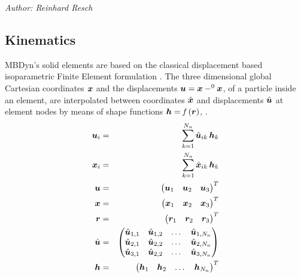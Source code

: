 %
%
%
%
%
%
%
%
\emph{Author: Reinhard Resch}
\subsection{Kinematics}
MBDyn's solid elements are based on the classical displacement based isoparametric Finite Element formulation \cite{BATHE2016}.
The three dimensional global Cartesian coordinates $\bm{x}$ and the displacements $\bm{u}=\bm{x} - ^0\bm{x}$, of a particle inside an element,
are interpolated between coordinates $\hat{\bm{x}}$ and displacements $\hat{\bm{u}}$ at element nodes by means of shape functions $\bm{h}=\mathit{f}\left(\bm{r}\right)$\cite{BATHE2016}, \cite{KUEBLER2005}.
\begin{eqnarray}
  \bm{u}_{i} &=& \sum_{k=1}^{N_n}\hat{\bm{u}}_{ik} \,\bm{h}_{k} \\
  \bm{x}_{i} &=& \sum_{k=1}^{N_n}\hat{\bm{x}}_{ik} \,\bm{h}_{k} \\
  \bm{u} &=& \begin{pmatrix} \bm{u}_1 & \bm{u}_2 & \bm{u}_3 \end{pmatrix}^T \\
  \bm{x} &=& \begin{pmatrix} \bm{x}_1 & \bm{x}_2 & \bm{x}_3 \end{pmatrix}^T \\
  \bm{r} &=& \begin{pmatrix} \bm{r}_1 & \bm{r}_2 & \bm{r}_3 \end{pmatrix}^T \\
  \hat{\bm{u}} &=& \begin{pmatrix}
    \hat{\bm{u}}_{1,1} & \hat{\bm{u}}_{1,2} & \ldots{} & \hat{\bm{u}}_{1,N_n} \\
    \hat{\bm{u}}_{2,1} & \hat{\bm{u}}_{2,2} & \ldots{} & \hat{\bm{u}}_{2,N_n} \\
    \hat{\bm{u}}_{3,1} & \hat{\bm{u}}_{2,2} & \ldots{} & \hat{\bm{u}}_{3,N_n}
  \end{pmatrix} \\
  \bm{h} & = & \begin{pmatrix}
    \bm{h}_1 & \bm{h}_2 & \ldots{} & \bm{h}_{N_n}
  \end{pmatrix}^T
\end{eqnarray}

